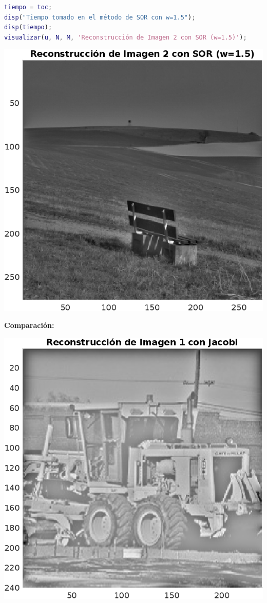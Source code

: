 \begin{homeworkProblem}
\begin{solucion}
\begin{enumerate}
\begin{lstlisting}[language = matlab]
tiempo = toc;
disp("Tiempo tomado en el método de SOR con w=1.5");
disp(tiempo);
visualizar(u, N, M, 'Reconstrucción de Imagen 2 con SOR (w=1.5)');
        \end{lstlisting}
        \begin{center}
          \includegraphics[scale=0.5]{Figures/Figure_2SOR.png}
        \end{center}
        \newpage
    \end{enumerate}
    \textbf{Comparación:}
    \begin{center}
      \includegraphics[scale=0.6]{Figures/Figure_1J.png}

\end{center}
\end{solucion}
\end{homeworkProblem}
